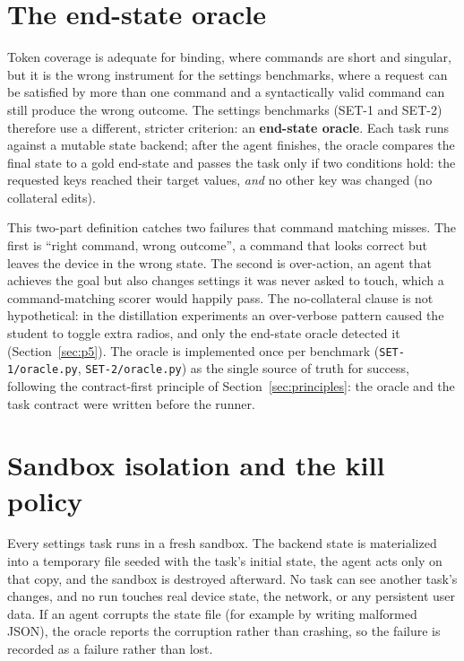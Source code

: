 \section{The end-state oracle}
\label{sec:m-oracle}

Token coverage is adequate for binding, where commands are short and singular,
but it is the wrong instrument for the settings benchmarks, where a request can
be satisfied by more than one command and a syntactically valid command can still
produce the wrong outcome. The settings benchmarks (SET-1 and SET-2) therefore
use a different, stricter criterion: an \textbf{end-state oracle}. Each task runs
against a mutable state backend; after the agent finishes, the oracle compares
the final state to a gold end-state and passes the task only if two conditions
hold: the requested keys reached their target values, \emph{and} no other key was
changed (no collateral edits).

This two-part definition catches two failures that command matching misses. The
first is ``right command, wrong outcome'', a command that looks correct but
leaves the device in the wrong state. The second is over-action, an agent that
achieves the goal but also changes settings it was never asked to touch, which a
command-matching scorer would happily pass. The no-collateral clause is not
hypothetical: in the distillation experiments an over-verbose pattern caused the
student to toggle extra radios, and only the end-state oracle detected it
(Section~\ref{sec:p5}). The oracle is implemented once per benchmark
(\texttt{SET-1/oracle.py}, \texttt{SET-2/oracle.py}) as the single source of
truth for success, following the contract-first principle of
Section~\ref{sec:principles}: the oracle and the task contract were written
before the runner.

\section{Sandbox isolation and the kill policy}
\label{sec:m-sandbox}

Every settings task runs in a fresh sandbox. The backend state is materialized
into a temporary file seeded with the task's initial state, the agent acts only
on that copy, and the sandbox is destroyed afterward. No task can see another
task's changes, and no run touches real device state, the network, or any
persistent user data. If an agent corrupts the state file (for example by writing
malformed JSON), the oracle reports the corruption rather than crashing, so the
failure is recorded as a failure rather than lost.

